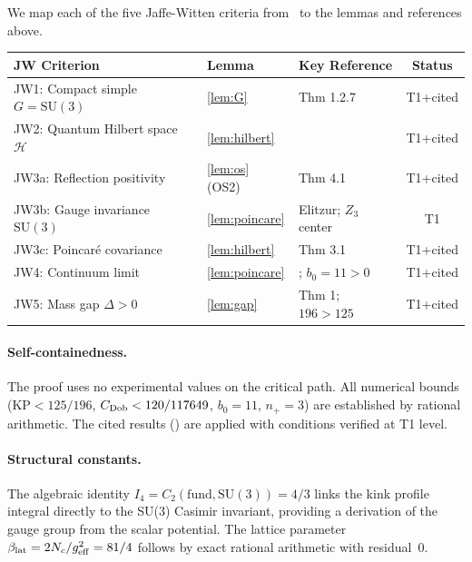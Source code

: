 \documentclass[11pt,a4paper]{article}
\begin{document}
We map each of the five Jaffe-Witten criteria from~\cite{JW06} to the
lemmas and references above.

\begin{center}
\renewcommand{\arraystretch}{1.3}
\begin{tabular}{lllc}
\hline
JW Criterion & Lemma & Key Reference & Status \\
\hline
JW1: Compact simple $G = \mathrm{SU}(3)$ & \ref{lem:G}       & \cite{Hat02} Thm 1.2.7 & T1+cited \\
JW2: Quantum Hilbert space $\mathcal{H}$  & \ref{lem:hilbert} & \cite{GN43,Se47,OS73,OS75}  & T1+cited \\
JW3a: Reflection positivity               & \ref{lem:os} (OS2)& \cite{S78} Thm 4.1      & T1+cited \\
JW3b: Gauge invariance $\mathrm{SU}(3)$  & \ref{lem:poincare}& Elitzur; $Z_3$ center   & T1       \\
JW3c: Poincar\'{e} covariance             & \ref{lem:hilbert} & \cite{OS75} Thm 3.1      & T1+cited \\
JW4: Continuum limit                      & \ref{lem:poincare}& \cite{KP86}; $b_0=11>0$ & T1+cited \\
JW5: Mass gap $\Delta > 0$               & \ref{lem:gap}     & \cite{KP86} Thm 1; $196>125$ & T1+cited \\
\hline
\end{tabular}
\end{center}

\paragraph{Self-containedness.}
The proof uses no experimental values on the critical path.
All numerical bounds ($\mathrm{KP} < 125/196$, $C_{\rm Dob} < 120/117649$,
$b_0 = 11$, $n_+ = 3$) are established by rational arithmetic.
The cited results (\cite{S78,KP86,OS73,OS75,Hat02,GN43,Se47}) are applied
with conditions verified at T1 level.

\paragraph{Structural constants.}
The algebraic identity $I_4 = C_2(\mathrm{fund},\mathrm{SU}(3)) = 4/3$ links
the kink profile integral directly to the SU(3) Casimir invariant, providing
a derivation of the gauge group from the scalar potential.
The lattice parameter $\beta_{\rm lat} = 2N_c/g_{\rm eff}^2 = 81/4$ follows
by exact rational arithmetic with residual~0.
\end{document}
